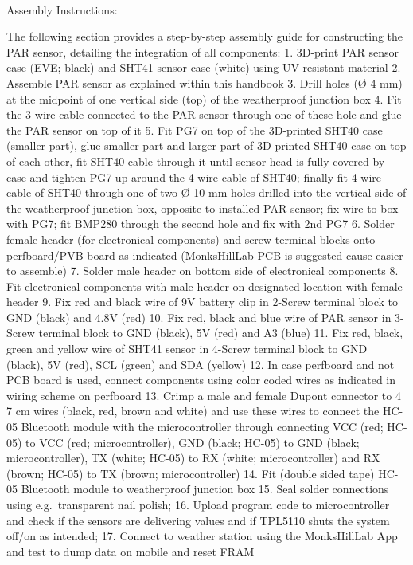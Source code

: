 \documentclass[
  11pt,
  letterpaper,
]{book}
\makeatletter
\let\oldparagraph\paragraph
\renewcommand{\paragraph}{
    \@ifstar
      \xxxParagraphStar
      \xxxParagraphNoStar
  }
\newcommand{\xxxParagraphStar}[1]{\oldparagraph*{#1}\mbox{}}
\newcommand{\xxxParagraphNoStar}[1]{\oldparagraph{#1}\mbox{}}
\makeatother
\begin{document}
\paragraph{Assembly Instructions:}\label{sec-eve-offline-assembly}

The following section provides a step-by-step assembly guide for
constructing the PAR sensor, detailing the integration of all
components: 1. 3D-print PAR sensor case (EVE; black) and SHT41 sensor
case (white) using UV-resistant material 2. Assemble PAR sensor as
explained within this handbook 3. Drill holes (Ø 4 mm) at the midpoint
of one vertical side (top) of the weatherproof junction box 4. Fit the
3-wire cable connected to the PAR sensor through one of these hole and
glue the PAR sensor on top of it 5. Fit PG7 on top of the 3D-printed
SHT40 case (smaller part), glue smaller part and larger part of
3D-printed SHT40 case on top of each other, fit SHT40 cable through it
until sensor head is fully covered by case and tighten PG7 up around the
4-wire cable of SHT40; finally fit 4-wire cable of SHT40 through one of
two Ø 10 mm holes drilled into the vertical side of the weatherproof
junction box, opposite to installed PAR sensor; fix wire to box with
PG7; fit BMP280 through the second hole and fix with 2nd PG7 6. Solder
female header (for electronical components) and screw terminal blocks
onto perfboard/PVB board as indicated (MonksHillLab PCB is suggested
cause easier to assemble) 7. Solder male header on bottom side of
electronical components 8. Fit electronical components with male header
on designated location with female header 9. Fix red and black wire of
9V battery clip in 2-Screw terminal block to GND (black) and 4.8V (red)
10. Fix red, black and blue wire of PAR sensor in 3-Screw terminal block
to GND (black), 5V (red) and A3 (blue) 11. Fix red, black, green and
yellow wire of SHT41 sensor in 4-Screw terminal block to GND (black), 5V
(red), SCL (green) and SDA (yellow) 12. In case perfboard and not PCB
board is used, connect components using color coded wires as indicated
in wiring scheme on perfboard 13. Crimp a male and female Dupont
connector to 4 7 cm wires (black, red, brown and white) and use these
wires to connect the HC-05 Bluetooth module with the microcontroller
through connecting VCC (red; HC-05) to VCC (red; microcontroller), GND
(black; HC-05) to GND (black; microcontroller), TX (white; HC-05) to RX
(white; microcontroller) and RX (brown; HC-05) to TX (brown;
microcontroller) 14. Fit (double sided tape) HC-05 Bluetooth module to
weatherproof junction box 15. Seal solder connections using
e.g.~transparent nail polish; 16. Upload program code to microcontroller
and check if the sensors are delivering values and if TPL5110 shuts the
system off/on as intended; 17. Connect to weather station using the
MonksHillLab App and test to dump data on mobile and reset FRAM
\end{document}
